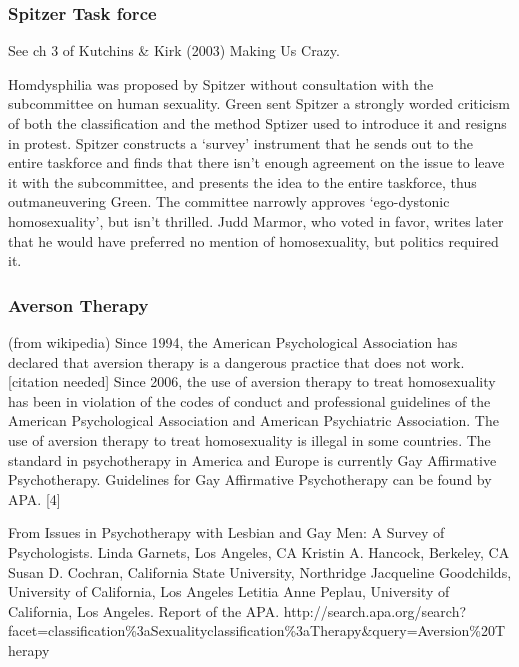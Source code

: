 \begin{refsection}
\subsubsection{Spitzer Task force}
\label{spitzertaskforce}

See ch 3 of Kutchins \& Kirk (2003) Making Us Crazy. 

Homdysphilia was proposed by Spitzer without consultation with the subcommittee on human sexuality. Green sent Spitzer a strongly worded criticism of both the classification and the method Sptizer used to introduce it and resigns in protest. Spitzer constructs a `survey' instrument that he sends out to the entire taskforce and finds that there isn't enough agreement on the issue to leave it with the subcommittee, and presents the idea to the entire taskforce, thus outmaneuvering Green. The committee narrowly approves `ego-dystonic homosexuality', but isn't thrilled. Judd Marmor, who voted in favor, writes later that he would have preferred no mention of homosexuality, but politics required it.

\subsubsection{Averson Therapy}
\label{aversontherapy}

(from wikipedia) Since 1994, the American Psychological Association has declared that aversion therapy is a dangerous practice that does not work.[citation needed] Since 2006, the use of aversion therapy to treat homosexuality has been in violation of the codes of conduct and professional guidelines of the American Psychological Association and American Psychiatric Association. The use of aversion therapy to treat homosexuality is illegal in some countries. The standard in psychotherapy in America and Europe is currently Gay Affirmative Psychotherapy. Guidelines for Gay Affirmative Psychotherapy can be found by APA. [4]

From Issues in Psychotherapy with Lesbian and Gay Men: A Survey of Psychologists. Linda Garnets, Los Angeles, CA Kristin A. Hancock, Berkeley, CA Susan D. Cochran, California State University, Northridge Jacqueline Goodchilds, University of California, Los Angeles Letitia Anne Peplau, University of California, Los Angeles. Report of the APA. http:\slash \slash search.apa.org\slash search?facet=classification\%3aSexuality\textbar{}\textbar{}classification\%3aTherapy\&query=Aversion\%20Therapy


\end{refsection}
